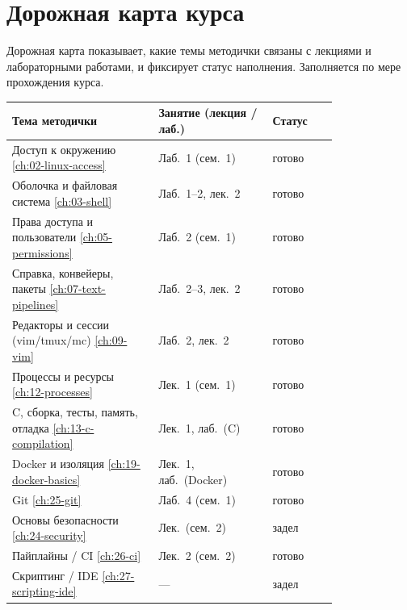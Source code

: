 \chapter{Дорожная карта курса}
\label{app:roadmap}

Дорожная карта показывает, какие темы методички связаны с лекциями и
лабораторными работами, и фиксирует статус наполнения. Заполняется по мере
прохождения курса.

\begin{longtable}{@{}p{0.45\linewidth}p{0.35\linewidth}l@{}}
\toprule
Тема методички & Занятие (лекция / лаб.) & Статус \\
\midrule
\endhead

Доступ к окружению \ref{ch:02-linux-access}         & Лаб.\ 1 (сем.\ 1)      & готово \\
Оболочка и файловая система \ref{ch:03-shell}       & Лаб.\ 1--2, лек.\ 2   & готово \\
Права доступа и пользователи \ref{ch:05-permissions} & Лаб.\ 2 (сем.\ 1)   & готово \\
Справка, конвейеры, пакеты \ref{ch:07-text-pipelines} & Лаб.\ 2--3, лек.\ 2 & готово \\
Редакторы и сессии (vim/tmux/mc) \ref{ch:09-vim}    & Лаб.\ 2, лек.\ 2      & готово \\
Процессы и ресурсы \ref{ch:12-processes}            & Лек.\ 1 (сем.\ 1)    & готово \\
C, сборка, тесты, память, отладка \ref{ch:13-c-compilation} & Лек.\ 1, лаб.\ (C) & готово \\
Docker и изоляция \ref{ch:19-docker-basics}         & Лек.\ 1, лаб.\ (Docker) & готово \\
Git \ref{ch:25-git}                                  & Лаб.\ 4 (сем.\ 1)    & готово \\
Основы безопасности \ref{ch:24-security}            & Лек.\ (сем.\ 2)      & задел \\
Пайплайны / CI \ref{ch:26-ci}                        & Лек.\ 2 (сем.\ 2)    & готово \\
Скриптинг / IDE \ref{ch:27-scripting-ide}           & ---                  & задел \\
\bottomrule
\end{longtable}

